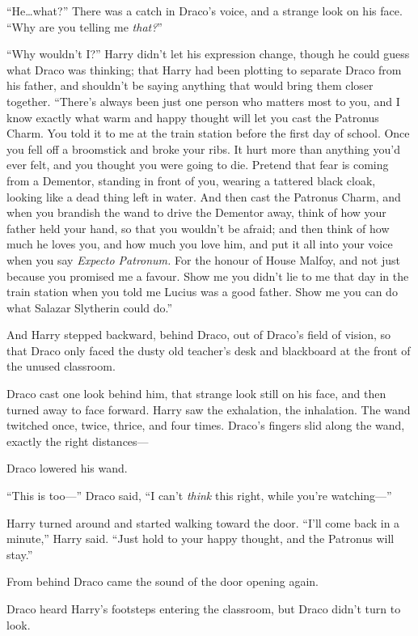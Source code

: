 “He…what?” There was a catch in Draco’s voice, and a strange look on his face. “Why are you telling me \emph{that?}”

“Why wouldn’t I?” Harry didn’t let his expression change, though he could guess what Draco was thinking; that Harry had been plotting to separate Draco from his father, and shouldn’t be saying anything that would bring them closer together. “There’s always been just one person who matters most to you, and I know exactly what warm and happy thought will let you cast the Patronus Charm. You told it to me at the train station before the first day of school. Once you fell off a broomstick and broke your ribs. It hurt more than anything you’d ever felt, and you thought you were going to die. Pretend that fear is coming from a Dementor, standing in front of you, wearing a tattered black cloak, looking like a dead thing left in water. And then cast the Patronus Charm, and when you brandish the wand to drive the Dementor away, think of how your father held your hand, so that you wouldn’t be afraid; and then think of how much he loves you, and how much you love him, and put it all into your voice when you say \emph{Expecto Patronum.} For the honour of House Malfoy, and not just because you promised me a favour. Show me you didn’t lie to me that day in the train station when you told me Lucius was a good father. Show me you can do what Salazar Slytherin could do.”

And Harry stepped backward, behind Draco, out of Draco’s field of vision, so that Draco only faced the dusty old teacher’s desk and blackboard at the front of the unused classroom.

Draco cast one look behind him, that strange look still on his face, and then turned away to face forward. Harry saw the exhalation, the inhalation. The wand twitched once, twice, thrice, and four times. Draco’s fingers slid along the wand, exactly the right distances—

Draco lowered his wand.

“This is too—” Draco said, “I can’t \emph{think} this right, while you’re watching—”

Harry turned around and started walking toward the door. “I’ll come back in a minute,” Harry said. “Just hold to your happy thought, and the Patronus will stay.”

\later

From behind Draco came the sound of the door opening again.

Draco heard Harry’s footsteps entering the classroom, but Draco didn’t turn to look.

